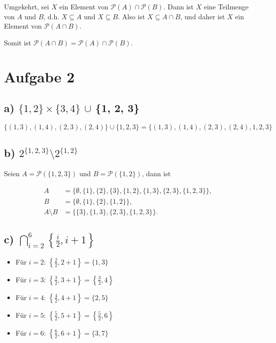 \documentclass[12pt]{article}
\begin{document}
Umgekehrt, sei \( X \) ein Element von \( \mathcal{P}(A) \cap \mathcal{P}(B) \).
Dann ist \( X \) eine Teilmenge von \( A \) und \( B \), d.h. \( X \subseteq A \) und \( X \subseteq B \).
Also ist \( X \subseteq A \cap B \), und daher ist \( X \) ein Element von \( \mathcal{P}(A \cap B) \).

Somit ist \( \mathcal{P}(A \cap B) = \mathcal{P}(A) \cap \mathcal{P}(B) \).

\section*{Aufgabe 2}

\subsection*{a) \( \{1, 2\} \times \{3, 4\}\) \(\cup\) \{1, 2, 3\}}

\[\{(1, 3), (1, 4), (2, 3), (2, 4)\} \cup \{1, 2, 3\} = \{(1, 3), (1, 4), (2, 3), (2, 4), 1, 2, 3\}\]

\subsection*{b) \(2^{\{1,2,3\}} \setminus 2^{\{1,2\}}\)}

Seien \(A = \mathcal{P}(\{1,2,3\})\) und \(B = \mathcal{P}(\{1,2\})\), dann ist 

\begin{align*}
	A             & = \{\emptyset, \{1\}, \{2\}, \{3\}, \{1, 2\}, \{1, 3\}, \{2, 3\}, \{1, 2, 3\}\}, \\
	B             & = \{\emptyset, \{1\}, \{2\}, \{1, 2\}\},                                         \\
	A \setminus B & = \{\{3\}, \{1, 3\}, \{2, 3\}, \{1, 2, 3\}\}.
\end{align*}

\subsection*{c) \( \bigcap_{i=2}^{6} \left\{\frac{i}{2}, i + 1\right\} \)}

\begin{itemize}
	\item Für \( i = 2 \): \( \left\{\frac{2}{2}, 2 + 1\right\} = \{1, 3\} \)
	\item Für \( i = 3 \): \( \left\{\frac{3}{2}, 3 + 1\right\} = \left\{\frac{3}{2}, 4\right\} \)
	\item Für \( i = 4 \): \( \left\{\frac{4}{2}, 4 + 1\right\} = \{2, 5\} \)
	\item Für \( i = 5 \): \( \left\{\frac{5}{2}, 5 + 1\right\} = \left\{\frac{5}{2}, 6\right\} \)
	\item Für \( i = 6 \): \( \left\{\frac{6}{2}, 6 + 1\right\} = \{3, 7\} \)
\end{itemize}
\end{document}
